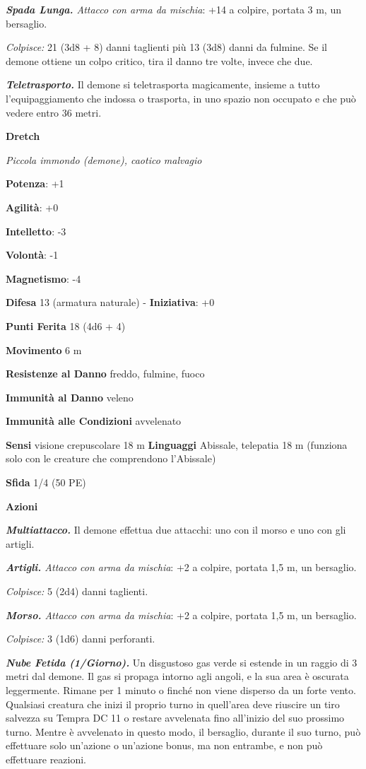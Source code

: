 \begin{multicols}{2}
\emph{\textbf{Spada Lunga.} Attacco con arma da mischia}: +14 a colpire,
portata 3 m, un bersaglio.

\emph{Colpisce:} 21 (3d8 + 8) danni taglienti più 13 (3d8) danni da
fulmine. Se il demone ottiene un colpo critico, tira il danno tre volte,
invece che due.

\emph{\textbf{Teletrasporto.}} Il demone si teletrasporta magicamente,
insieme a tutto l'equipaggiamento che indossa o trasporta, in uno spazio
non occupato e che può vedere entro 36 metri.

\textbf{Dretch}

\emph{Piccola immondo (demone), caotico malvagio}

\textbf{Potenza}: +1

\textbf{Agilità}: +0

\textbf{Intelletto}: -3

\textbf{Volontà}: -1

\textbf{Magnetismo}: -4

\textbf{Difesa} 13 (armatura naturale) - \textbf{Iniziativa}: +0

\textbf{Punti Ferita} 18 (4d6 + 4)

\textbf{Movimento} 6 m

\textbf{Resistenze al Danno} freddo, fulmine, fuoco

\textbf{Immunità al Danno} veleno

\textbf{Immunità alle Condizioni} avvelenato

\textbf{Sensi} visione crepuscolare 18 m
\textbf{Linguaggi} Abissale, telepatia 18 m (funziona solo con le
creature che comprendono l'Abissale)

\textbf{Sfida} 1/4 (50 PE)

\textbf{Azioni}

\emph{\textbf{Multiattacco.}} Il demone effettua due attacchi: uno con
il morso e uno con gli artigli.

\emph{\textbf{Artigli.} Attacco con arma da mischia}: +2 a colpire,
portata 1,5 m, un bersaglio.

\emph{Colpisce:} 5 (2d4) danni taglienti.

\emph{\textbf{Morso.} Attacco con arma da mischia}: +2 a colpire,
portata 1,5 m, un bersaglio.

\emph{Colpisce:} 3 (1d6) danni perforanti.

\emph{\textbf{Nube Fetida (1/Giorno).}} Un disgustoso gas verde si
estende in un raggio di 3 metri dal demone. Il gas si propaga intorno
agli angoli, e la sua area è oscurata leggermente. Rimane per 1 minuto o
finché non viene disperso da un forte vento. Qualsiasi creatura che
inizi il proprio turno in quell'area deve riuscire un tiro salvezza su Tempra DC 11 o restare avvelenata fino all'inizio del suo prossimo
turno. Mentre è avvelenato in questo modo, il bersaglio, durante il suo
turno, può effettuare solo un'azione o un'azione bonus, ma non entrambe,
e non può effettuare reazioni.




\end{multicols}
